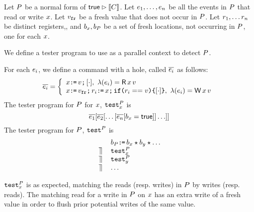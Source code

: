 Let $P$ be a normal form of $\mathsf{true}\mathbin\rhd \llbracket C\rrbracket$.  Let $e_1, \ldots, e_n$ be all the events in $P$ that read or write $x$.  Let $v_{{\tt fr}}$ be a fresh value that does not occur in $P$.  Let $r_1, \ldots r_n$ be distinct registers,, and $b_{x}, b_{P}$ be a  set of fresh locations, not occurring in $P$, one for each $x$.


We define a tester program to use as a parallel context to detect $P$. 
\begin{definition}\label{testAPS}
For each $e_i$, we define a command with a hole, called $\overline{e_i}$ as follows:
\[
\test{\aEv_i} = \left\{ 
                             \begin{array}{l}
                              \aLoc\GETS\aVal \SEMI \hole{\cdot}, \ \labeling(\aEv_i) = \DR{\aLoc}{\aVal} \\
                              \aLoc\GETS\freshaval\SEMI \aReg_i \GETS\aLoc \SEMI \IF{\aReg_i == \aVal} \THEN \hole{\cdot} \FI , \ \labeling(\aEv_i) = \DW{\aLoc}{\aVal} \\
                           \end{array}
                       \right.
\]    
The tester program for $P$ for $x$, ${\tt test}^{P}_{x}$ is \[ \overline{e_1}[\overline{e_2}[\ldots [\overline{e_n}[b_{x} = \mathsf{true}]]\ldots]] \]
The tester program for $P$, ${\tt test}^{P}_{}$ is 
\[
\begin{array}{ll}
& b_{P}\texttt{:}\mkern-1mu\texttt{=}\, b_{x} \star b_{y} \star  \ldots   \\
\,\mathbin{\rrceil}\, & {\tt test}^{P}_{x} \\
\,\mathbin{\rrceil}\, & {\tt test}^{P}_{y} \\
 \,\mathbin{\rrceil}\,  & \ldots 
\end{array}
\]
\end{definition}
 ${\tt test}^{P}_{x}$ is as expected, matching the reads (resp. writes) in $P$ by writes (resp. reads).  The matching read for a write in $P$ on $x$ has an extra write of a fresh value in order to flush prior potential writes of the same value.    

 

